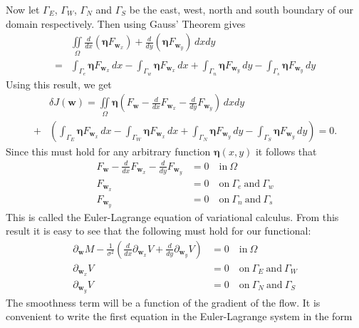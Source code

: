\documentclass[10pt,a4paper]{article}
\begin{document}
Now let $\Gamma_{E}$, $\Gamma_{W}$, $\Gamma_{N}$ and $\Gamma_{S}$ be the east, west, north and south boundary of our domain respectively. Then using Gauss' Theorem gives
\begin{align*}
& \iint \limits_{\Omega}  \frac{d}{d x} (\bm{\eta} F_{\textbf{w}_x}) + \frac{d }{d y} (\bm{\eta} F_{\textbf{w}_y}) \, dxdy \\ =  &\int_{\Gamma_{e}} \bm{\eta} F_{\textbf{w}_x} \, dx - \int_{\Gamma_{w}} \bm{\eta} F_{\textbf{w}_x} \, dx + \int_{\Gamma_{n}} \bm{\eta} F_{\textbf{w}_y} \, dy - \int_{\Gamma_{s}} \bm{\eta} F_{\textbf{w}_y} \, dy
\end{align*}
Using this result, we get
\begin{align*}
&\delta J(\textbf{w}) = \iint \limits_{\Omega} \bm{\eta} \left( F_\textbf{w} -  \frac{d}{d x} F_{\textbf{w}_x} - \frac{d }{d y} F_{\textbf{w}_y} \right) \, dxdy  \\ + & \left( \int_{\Gamma_{E}} \bm{\eta} F_{\textbf{w}_x} \, dx - \int_{\Gamma_{W}} \bm{\eta} F_{\textbf{w}_x} \, dx + \int_{\Gamma_{N}} \bm{\eta} F_{\textbf{w}_y} \, dy - \int_{\Gamma_{S}} \bm{\eta} F_{\textbf{w}_y} \, dy \right) = 0.
\end{align*}
Since this must hold for any arbitrary function $\bm{\eta}(x,y)$ it follows that
\begin{align*}
F_{\textbf{w}} - \frac{d}{dx} F_{\textbf{w}_x} - \frac{d }{d y} F_{\textbf{w}_y} &= 0 \quad \text{in} \ \Omega \\
F_{\textbf{w}_x} &= 0 \quad \text{on} \ \Gamma_e \ \text{and} \ \Gamma_w \\
F_{\textbf{w}_y}& = 0 \quad \text{on} \ \Gamma_n \ \text{and} \ \Gamma_s
\end{align*}
This is called the Euler-Lagrange equation of variational calculus. From this result it is easy to see that the following must hold for our functional:
\begin{equation}
\label{EL}
  \begin{aligned}
\partial_{\textbf{w}} M - \frac{1}{\sigma^2}\left( \frac{d}{d x} \partial_{\textbf{w}_x} V + \frac{d}{d y} \partial_{\textbf{w}_y} V \right) &= 0 \quad \text{in} \ \Omega  \\
\partial_{\textbf{w}_x} V &= 0 \quad \text{on} \ \Gamma_E \ \text{and} \ \Gamma_W \\
\partial_{\textbf{w}_y} V &= 0 \quad \text{on} \ \Gamma_N \ \text{and} \ \Gamma_S
  \end{aligned}
\end{equation}
The smoothness term will be a function of the gradient of the flow. It is convenient to write the first equation in the Euler-Lagrange system in the form
\end{document}

